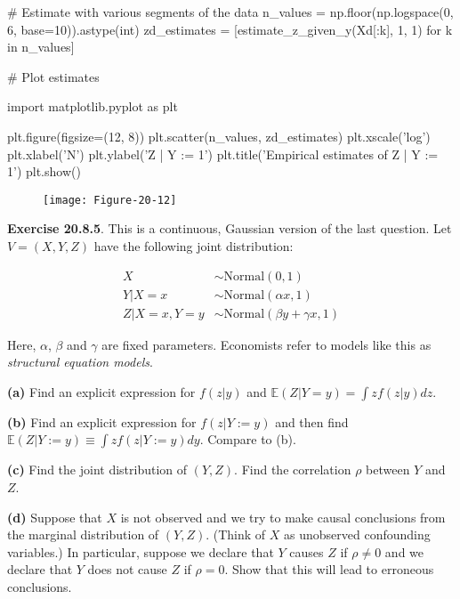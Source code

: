 \begin{python}
# Estimate with various segments of the data
n_values = np.floor(np.logspace(0, 6, base=10)).astype(int)
zd_estimates = [estimate_z_given_y(Xd[:k], 1, 1) for k in n_values]
\end{python}

\begin{python}
# Plot estimates

import matplotlib.pyplot as plt

plt.figure(figsize=(12, 8))
plt.scatter(n_values, zd_estimates)
plt.xscale('log')
plt.xlabel('N')
plt.ylabel('Z | Y := 1')
plt.title('Empirical estimates of Z | Y := 1')
plt.show()
\end{python}

\begin{figure}[H]
\centering
\texttt{[image: Figure-20-12]}
\end{figure}

\textbf{Exercise 20.8.5}. This is a continuous, Gaussian version of the
last question. Let \(V = (X, Y, Z)\) have the following joint
distribution:

\begin{align*}
X &\sim \text{Normal}(0, 1) \\
Y | X = x &\sim \text{Normal}(\alpha x, 1) \\
Z | X = x, Y = y &\sim \text{Normal}(\beta y + \gamma x, 1)
\end{align*}

Here, \(\alpha\), \(\beta\) and \(\gamma\) are fixed parameters.
Economists refer to models like this as \emph{structural equation
models}.

\textbf{(a)} Find an explicit expression for \(f(z | y)\) and
\(\mathbb{E}(Z | Y = y) = \int z f(z | y) dz\).

\textbf{(b)} Find an explicit expression for \(f(z | Y := y)\) and then
find \(\mathbb{E}(Z | Y := y) \equiv \int z f(z | Y := y) dy\). Compare
to (b).

\textbf{(c)} Find the joint distribution of \((Y, Z)\). Find the
correlation \(\rho\) between \(Y\) and \(Z\).

\textbf{(d)} Suppose that \(X\) is not observed and we try to make
causal conclusions from the marginal distribution of \((Y, Z)\). (Think
of \(X\) as unobserved confounding variables.) In particular, suppose we
declare that \(Y\) causes \(Z\) if \(\rho \neq 0\) and we declare that
\(Y\) does not cause \(Z\) if \(\rho = 0\). Show that this will lead to
erroneous conclusions.

